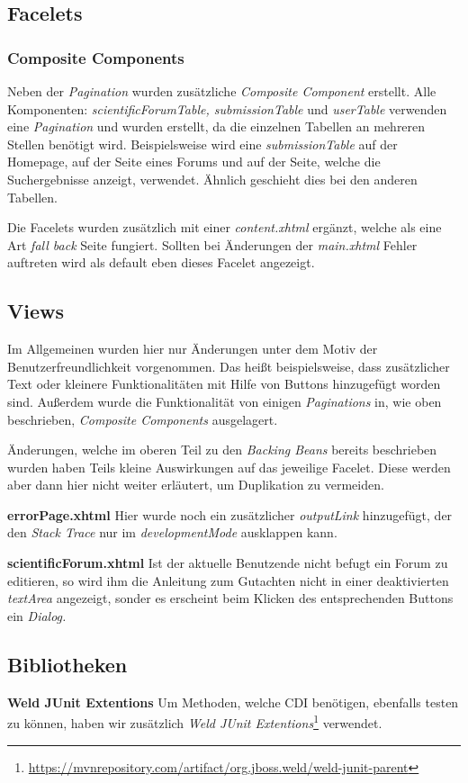 \subsection{Facelets}

\subsubsection{Composite Components}

Neben der \emph{Pagination} wurden zusätzliche \emph{Composite Component} erstellt. Alle Komponenten: \emph{scientificForumTable, submissionTable} und \emph{userTable} verwenden eine  \emph{Pagination} und wurden erstellt, da die einzelnen Tabellen an mehreren Stellen benötigt wird. Beispielsweise wird eine \emph{submissionTable} auf der Homepage, auf der Seite eines Forums und auf der Seite, welche die Suchergebnisse anzeigt, verwendet. Ähnlich geschieht dies bei den anderen Tabellen.

Die Facelets wurden zusätzlich mit einer \emph{content.xhtml} ergänzt, welche als eine Art \emph{fall back} Seite fungiert. Sollten  bei Änderungen der \emph{main.xhtml} Fehler auftreten wird als default eben dieses Facelet angezeigt.

\subsection{Views}

Im Allgemeinen wurden hier nur Änderungen unter dem Motiv der Benutzerfreundlichkeit vorgenommen. Das heißt beispielsweise, dass zusätzlicher Text oder kleinere Funktionalitäten mit Hilfe von Buttons hinzugefügt worden sind. Außerdem wurde die Funktionalität von einigen \emph{Paginations} in, wie oben beschrieben, \emph{Composite Components} ausgelagert.

Änderungen, welche im oberen Teil zu den \emph{Backing Beans} bereits beschrieben wurden haben Teils kleine Auswirkungen auf das jeweilige Facelet. Diese werden aber dann hier nicht weiter erläutert, um Duplikation zu vermeiden.

\textbf{errorPage.xhtml} Hier wurde noch ein zusätzlicher \emph{outputLink} hinzugefügt, der den \emph{Stack Trace} nur im \emph{developmentMode} ausklappen kann.

\textbf{scientificForum.xhtml} Ist der aktuelle Benutzende nicht befugt ein Forum zu editieren, so wird ihm die Anleitung zum Gutachten nicht in einer deaktivierten \emph{textArea} angezeigt, sonder es erscheint beim Klicken des entsprechenden Buttons ein \emph{Dialog.}

\subsection{Bibliotheken}

\textbf{Weld JUnit Extentions} Um Methoden, welche CDI benötigen, ebenfalls testen zu können, haben wir zusätzlich \emph{Weld JUnit Extentions}\footnote{\url{https://mvnrepository.com/artifact/org.jboss.weld/weld-junit-parent}} verwendet.


